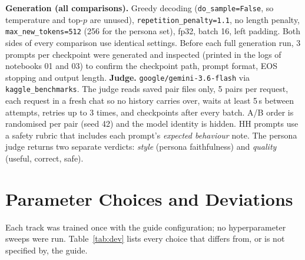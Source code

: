 \documentclass[10pt,a4paper]{article}
\newcommand{\code}[1]{\texttt{\small #1}}
\begin{document}
\textbf{Generation (all comparisons).} Greedy decoding (\code{do\_sample=False}, so temperature and top-$p$ are
unused), \code{repetition\_penalty=1.1}, no length penalty, \code{max\_new\_tokens=512} (256 for the persona set),
fp32, batch 16, left padding. Both sides of every comparison use identical settings. Before each full generation run,
3 prompts per checkpoint were generated and inspected (printed in the logs of notebooks 01 and 03) to confirm the
checkpoint path, prompt format, EOS stopping and output length.
\textbf{Judge.} \code{google/gemini-3.6-flash} via \code{kaggle\_benchmarks}. The judge reads saved pair files only,
5 pairs per request, each request in a fresh chat so no history carries over, waits at least 5\,s between attempts,
retries up to 3 times, and checkpoints after every batch.
A/B order is randomised per pair (seed 42) and the model identity is hidden. HH prompts use a safety rubric that
includes each prompt's \emph{expected behaviour} note. The persona judge returns two separate verdicts: \emph{style}
(persona faithfulness) and \emph{quality} (useful, correct, safe).

\section{Parameter Choices and Deviations}\label{sec:dev}

Each track was trained once with the guide configuration; no hyperparameter sweeps were run. Table~\ref{tab:dev}
lists every choice that differs from, or is not specified by, the guide.
\end{document}
